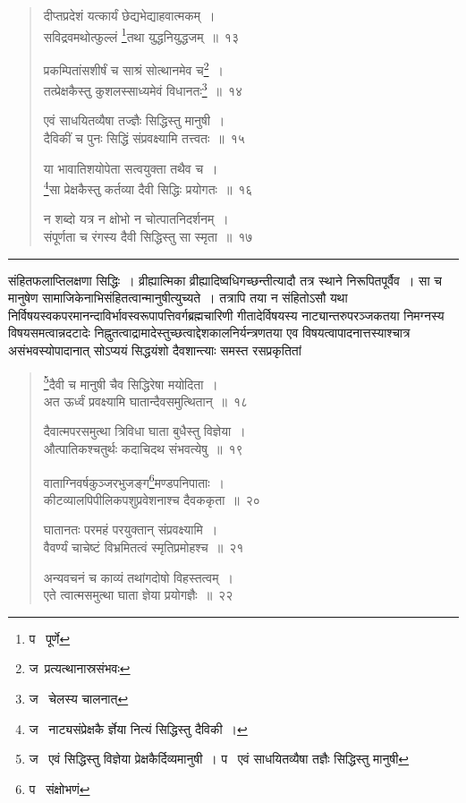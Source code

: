 \documentclass[11pt, openany]{book}
\begin{document}
\begin{quote}
{\na दीप्तप्रदेशं यत्कार्यं छेद्यभेद्याहवात्मकम्~।\\
सविद्रवमथोत्फुल्लं \renewcommand{\thefootnote}{1}\footnote{प \textendash\  पूर्णे}तथा युद्धनियुद्धजम्~॥~१३

प्रकम्पितांसशीर्षं च साश्रं सोत्थानमेव च\renewcommand{\thefootnote}{2}\footnote{ज\textendash\  प्रत्यत्थानास्रसंभवः}~।\\
तत्प्रेक्षकैस्तु कुशलस्साध्यमेवं विधानतः\renewcommand{\thefootnote}{3}\footnote{ज \textendash\  चेलस्य चालनात्}~॥~१४

एवं साधयितव्यैषा तज्ज्ञैः सिद्धिस्तु मानुषी~।\\
दैविकीं च पुनः सिद्धिं संप्रवक्ष्यामि तत्त्वतः~॥~१५

या भावातिशयोपेता सत्वयुक्ता तथैव च~।\\
\renewcommand{\thefootnote}{4}\footnote{ज \textendash\  नाट्यसंप्रेक्षकै र्ज्ञेया नित्यं सिद्धिस्तु दैविकी~।}सा प्रेक्षकैस्तु कर्तव्या दैवी सिद्धिः प्रयोगतः~॥~१६

न शब्दो यत्र न क्षोभो न चोत्पातनिदर्शनम्~।\\
संपूर्णता च रंगस्य दैवी सिद्धिस्तु सा स्मृता~॥~१७}
\end{quote}

\hrule

\vspace{2mm}
\noindent
संहितफलाप्तिलक्षणा सिद्धिः~। व्रीह्यात्मिका व्रीह्यादिष्वधिगच्छन्तीत्यादौ तत्र स्थाने निरूपितपूर्वैव~। सा च मानुषेण सामाजिकेनाभिसंहितत्वान्मानुषीत्युच्यते~। तत्रापि तया न संहितोऽसौ यथा निर्विषयस्वकपरमानन्दाविर्भावस्वरूपापत्तिवर्गब्रह्मचारिणी गीतादेर्विषयस्य नाट्यान्तरुपरञ्जकतया निमग्नस्य विषयसमत्वान्नदटादेः निह्नुतत्वाद्रामादेस्तुच्छत्वाद्देशकालनिर्यन्त्रणतया एव विषयत्वापादनात्तस्याश्चात्र असंभवस्योपादानात् सोऽप्ययं सिद्धयंशो दैवशान्त्याः समस्त रसप्रकृतितां\textendash

\newpage

\begin{quote}
{\na \renewcommand{\thefootnote}{1}\footnote{ज \textendash\  एवं सिद्धिस्तु विज्ञेया प्रेक्षकैर्दिव्यमानुषी~। प \textendash\  एवं साधयितव्यैषा तज्ञैः सिद्धिस्तु मानुषी}दैवी च मानुषी चैव सिद्धिरेषा मयोदिता~।\\
अत ऊर्ध्वं प्रवक्ष्यामि घातान्दैवसमुत्थितान्~॥~१८

दैवात्मपरसमुत्था त्रिविधा घाता बुधैस्तु विज्ञेया~।\\
औत्पातिकश्चतुर्थः कदाचिदथ संभवत्येषु~॥~१९

वाताग्निवर्षकुञ्जरभुजङ्ग\renewcommand{\thefootnote}{2}\footnote{प \textendash\  संक्षोभणं}मण्डपनिपाताः~।\\
कीटव्यालपिपीलिकपशुप्रवेशनाश्च दैवककृता~॥~२०

घातानतः परमहं परयुक्तान् संप्रवक्ष्यामि~।\\
वैवर्ण्यं चाचेष्टं विभ्रमितत्वं स्मृतिप्रमोहश्च~॥~२१

अन्यवचनं च काव्यं तथांगदोषो विहस्तत्वम्~।\\
एते त्वात्मसमुत्था घाता ज्ञेया प्रयोगज्ञैः~॥~२२}
\end{quote}
\end{document}
